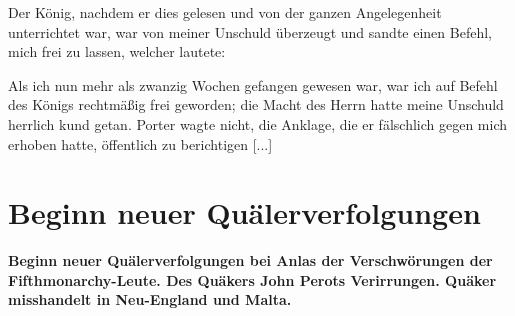 Der König, nachdem er dies gelesen und von der ganzen
Angelegenheit unterrichtet war, war von meiner Unschuld überzeugt 
und sandte einen Befehl, mich frei zu lassen, welcher lautete:


Als ich nun mehr als zwanzig Wochen gefangen gewesen
war, war ich auf Befehl des Königs rechtmäßig frei geworden;
die Macht des Herrn hatte meine Unschuld herrlich kund getan.
Porter wagte nicht, die Anklage, die er fälschlich gegen mich
erhoben hatte, öffentlich zu berichtigen [...]


\chapter[Beginn neuer Quälerverfolgungen]{Beginn neuer Quälerverfolgungen}

\begin{center}
\textbf{Beginn neuer Quälerverfolgungen bei Anlas der Verschwörungen
der Fifthmonarchy-Leute. Des Quäkers John Perots Verirrungen.
Quäker misshandelt in Neu-England und Malta.}
\end{center}

